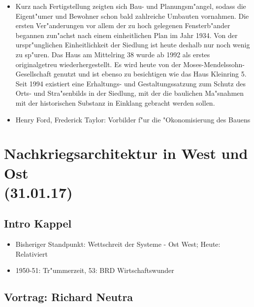 \documentclass[emulatestandardclasses]{scrartcl}
\begin{document}
\begin{itemize}
  \item Kurz nach Fertigstellung zeigten sich Bau- und Planungsm"angel, sodass die Eigent"umer und Bewohner schon bald zahlreiche Umbauten vornahmen. Die ersten Ver"anderungen vor allem der zu hoch gelegenen Fensterb"ander begannen zun"achst nach einem einheitlichen Plan im Jahr 1934. Von der urspr"unglichen Einheitlichkeit der Siedlung ist heute deshalb nur noch wenig zu sp"uren. Das Haus am Mittelring 38 wurde ab 1992 als erstes originalgetreu wiederhergestellt. Es wird heute von der Moses-Mendelssohn-Gesellschaft genutzt und ist ebenso zu besichtigen wie das Haus Kleinring 5. Seit 1994 existiert eine Erhaltungs- und Gestaltungssatzung zum Schutz des Orts- und Stra"senbilds in der Siedlung, mit der die baulichen Ma"snahmen mit der historischen Substanz in Einklang gebracht werden sollen.
  \item Henry Ford, Frederick Taylor: Vorbilder f"ur die "Okonomisierung des Bauens
\end{itemize}


\section{Nachkriegsarchitektur in West und Ost\\(31.01.17)}

\subsection{Intro Kappel}

\begin{itemize}
  \item Bisheriger Standpunkt: Wettschreit der Systeme - Ost West; Heute: Relativiert
  \item 1950-51: Tr"ummerzeit, 53: BRD Wirtschaftswunder
\end{itemize}


\subsection{Vortrag: Richard Neutra}
\end{document}
